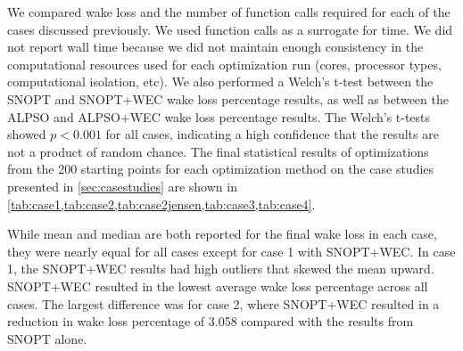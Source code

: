 \documentclass{jpconf}
\begin{document}
We compared wake loss and the number of function calls required for each of the cases discussed previously. We used function calls as a surrogate for time. We did not report wall time because we did not maintain enough consistency in the computational resources used for each optimization run (cores, processor types, computational isolation, etc). We also performed a Welch's t-test between the SNOPT and SNOPT+WEC wake loss percentage results, as well as between the ALPSO and ALPSO+WEC wake loss percentage results. The Welch's t-tests showed $p<0.001$ for all cases, indicating a high confidence that the results are not a product of random chance. The final statistical results of optimizations from the 200 starting points for each optimization method on the case studies presented in \cref{sec:casestudies} are shown in \cref{tab:case1,tab:case2,tab:case2jensen,tab:case3,tab:case4}. 

 While mean and median are both reported for the final wake loss in each case, they were nearly equal for all cases except for case 1 with SNOPT+WEC. In case 1, the SNOPT+WEC results had high outliers that skewed the mean upward. SNOPT+WEC resulted in the lowest average wake loss percentage across all cases. The largest difference was for case 2, where SNOPT+WEC resulted in a reduction in wake loss percentage of 3.058 compared with the results from SNOPT alone.
 
\end{document}
